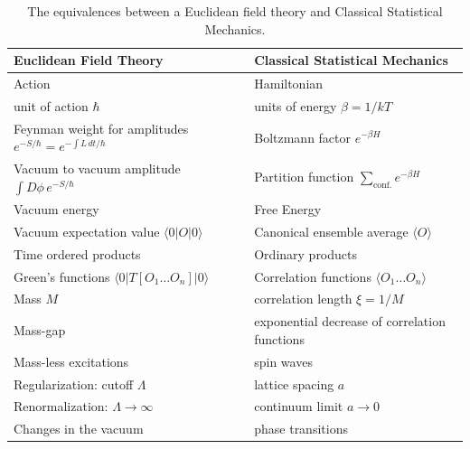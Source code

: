 \begin{table}[htbp]
\centering
\caption{The equivalences between a Euclidean field theory and Classical Statistical Mechanics.}
\label{tab:1}
\begin{tabular}{ll}
\toprule
\textbf{Euclidean Field Theory} & \textbf{Classical Statistical Mechanics} \\
\midrule
Action & Hamiltonian \\
unit of action $\hbar$ & units of energy $\beta = 1/kT$ \\
\shortstack{Feynman weight for amplitudes \\ $e^{-S/\hbar} = e^{-\int L\,dt/\hbar}$} & Boltzmann factor $e^{-\beta H}$ \\
\shortstack{Vacuum to vacuum amplitude \\ $\int D\phi\, e^{-S/\hbar}$} & \shortstack{Partition function \\ $\sum_{\mathrm{conf.}} e^{-\beta H}$} \\
Vacuum energy & Free Energy \\
Vacuum expectation value $\langle 0|O|0\rangle$ & Canonical ensemble average $\langle O\rangle$ \\
Time ordered products & Ordinary products \\
Green's functions $\langle 0|T[O_1 \ldots O_n]|0\rangle$ & Correlation functions $\langle O_1 \ldots O_n\rangle$ \\
Mass $M$ & correlation length $\xi = 1/M$ \\
Mass-gap & exponential decrease of correlation functions \\
Mass-less excitations & spin waves \\
Regularization: cutoff $\Lambda$ & lattice spacing $a$ \\
Renormalization: $\Lambda \to \infty$ & continuum limit $a \to 0$ \\
Changes in the vacuum & phase transitions \\
\bottomrule
\end{tabular}
\end{table}

